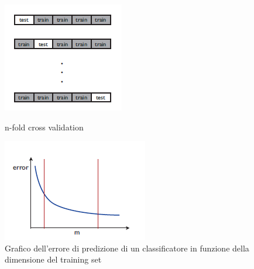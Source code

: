 \documentclass{article}
\begin{document}
	\begin{figure}[h]
		\begin{minipage}{0.47\textwidth}
			\centering
			\includegraphics[width=\textwidth]{CV1.png}
			\caption{n-fold cross validation}
			\label{fig:crossval}
		\end{minipage}
		\hfill
		\begin{minipage}{0.47\textwidth}
			\centering
			\includegraphics[width=\textwidth]{CV2.png}
			\caption{Grafico dell'errore di predizione di un classificatore in funzione della dimensione del training set}
			\label{fig:graph}
		\end{minipage}
	\end{figure}
\end{document}
